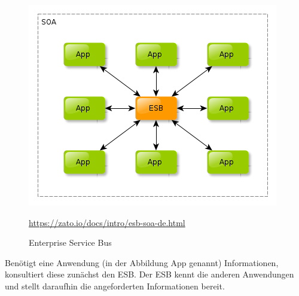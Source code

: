 \begin{figure}[htb]
    \centering 
    \includegraphics[width=\linewidth]{content/images/esb-ok}\
    \caption[ESB]{Enterprise Service Bus}
    \quelle\url{https://zato.io/docs/intro/esb-soa-de.html}
    \label{fig:esb}  
\end{figure}
\newpage
Benötigt eine Anwendung (in der Abbildung App genannt) Informationen, konsultiert diese zunächst den ESB. Der ESB kennt die anderen Anwendungen und stellt daraufhin die angeforderten Informationen bereit.